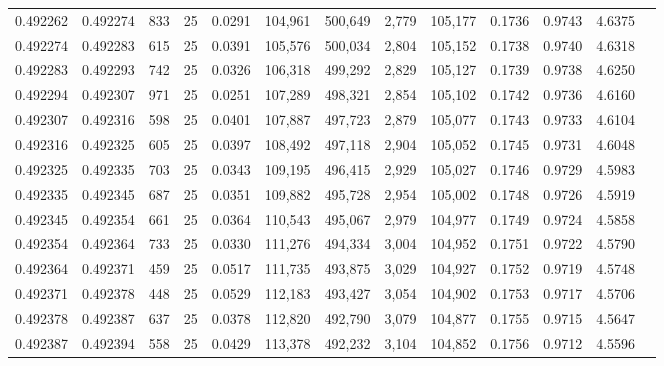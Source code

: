 \begin{tabular}{rrrrrrrrrrrrr}
0.492262 & 0.492274 &   833 &  25 &                                     0.0291 & 104,961 & 500,649 &   2,779 & 105,177 & 0.1736 & 0.9743 & 4.6375 \\
0.492274 & 0.492283 &   615 &  25 &                                     0.0391 & 105,576 & 500,034 &   2,804 & 105,152 & 0.1738 & 0.9740 & 4.6318 \\
0.492283 & 0.492293 &   742 &  25 &                                     0.0326 & 106,318 & 499,292 &   2,829 & 105,127 & 0.1739 & 0.9738 & 4.6250 \\
0.492294 & 0.492307 &   971 &  25 &                                     0.0251 & 107,289 & 498,321 &   2,854 & 105,102 & 0.1742 & 0.9736 & 4.6160 \\
0.492307 & 0.492316 &   598 &  25 &                                     0.0401 & 107,887 & 497,723 &   2,879 & 105,077 & 0.1743 & 0.9733 & 4.6104 \\
0.492316 & 0.492325 &   605 &  25 &                                     0.0397 & 108,492 & 497,118 &   2,904 & 105,052 & 0.1745 & 0.9731 & 4.6048 \\
0.492325 & 0.492335 &   703 &  25 &                                     0.0343 & 109,195 & 496,415 &   2,929 & 105,027 & 0.1746 & 0.9729 & 4.5983 \\
0.492335 & 0.492345 &   687 &  25 &                                     0.0351 & 109,882 & 495,728 &   2,954 & 105,002 & 0.1748 & 0.9726 & 4.5919 \\
0.492345 & 0.492354 &   661 &  25 &                                     0.0364 & 110,543 & 495,067 &   2,979 & 104,977 & 0.1749 & 0.9724 & 4.5858 \\
0.492354 & 0.492364 &   733 &  25 &                                     0.0330 & 111,276 & 494,334 &   3,004 & 104,952 & 0.1751 & 0.9722 & 4.5790 \\
0.492364 & 0.492371 &   459 &  25 &                                     0.0517 & 111,735 & 493,875 &   3,029 & 104,927 & 0.1752 & 0.9719 & 4.5748 \\
0.492371 & 0.492378 &   448 &  25 &                                     0.0529 & 112,183 & 493,427 &   3,054 & 104,902 & 0.1753 & 0.9717 & 4.5706 \\
0.492378 & 0.492387 &   637 &  25 &                                     0.0378 & 112,820 & 492,790 &   3,079 & 104,877 & 0.1755 & 0.9715 & 4.5647 \\
0.492387 & 0.492394 &   558 &  25 &                                     0.0429 & 113,378 & 492,232 &   3,104 & 104,852 & 0.1756 & 0.9712 & 4.5596 \\

\end{tabular}
